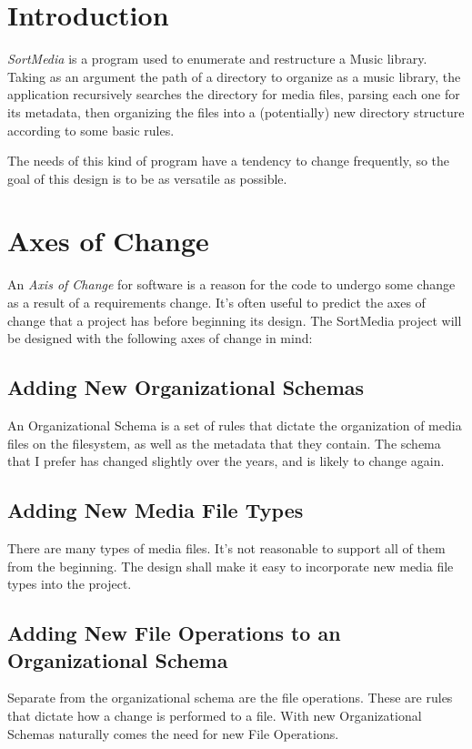 \documentclass{designdoc}
\begin{document}
\section{Introduction}
\textit{SortMedia} is a program used to enumerate and restructure a Music
library. Taking as an argument the path of a directory to organize as a music
library, the application recursively searches the directory for media files,
parsing each one for its metadata, then organizing the files into a
(potentially) new directory structure according to some basic rules.

The needs of this kind of program have a tendency to change frequently, so the
goal of this design is to be as versatile as possible.

\section{Axes of Change}
An \textit{Axis of Change} for software is a reason for the code to undergo
some change as a result of a requirements change. It's often useful to predict
the axes of change that a project has before beginning its design. The
SortMedia project will be designed with the following axes of change in mind:

\subsection{Adding New Organizational Schemas}
An Organizational Schema is a set of rules that dictate the organization of
media files on the filesystem, as well as the metadata that they contain. The
schema that I prefer has changed slightly over the years, and is likely to
change again.

\subsection{Adding New Media File Types}
There are many types of media files. It's not reasonable to support all of them
from the beginning. The design shall make it easy to incorporate new media file
types into the project.

\subsection{Adding New File Operations to an Organizational Schema}
Separate from the organizational schema are the file operations. These are
rules that dictate how a change is performed to a file. With new Organizational
Schemas naturally comes the need for new File Operations.
\end{document}
